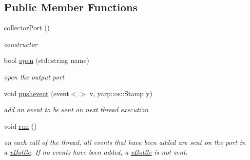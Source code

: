 \subsection*{Public Member Functions}
\begin{DoxyCompactItemize}
\item 
\hyperlink{classev_1_1collectorPort_ac7cd1de9c40bd46df66b67ae824bb258}{collector\+Port} ()\hypertarget{classev_1_1collectorPort_ac7cd1de9c40bd46df66b67ae824bb258}{}\label{classev_1_1collectorPort_ac7cd1de9c40bd46df66b67ae824bb258}

\begin{DoxyCompactList}\small\item\em constructor \end{DoxyCompactList}\item 
bool \hyperlink{classev_1_1collectorPort_a164072ae38c4e115873c451984b8e7f4}{open} (std\+::string name)\hypertarget{classev_1_1collectorPort_a164072ae38c4e115873c451984b8e7f4}{}\label{classev_1_1collectorPort_a164072ae38c4e115873c451984b8e7f4}

\begin{DoxyCompactList}\small\item\em open the output port \end{DoxyCompactList}\item 
void \hyperlink{classev_1_1collectorPort_ab1d587f6b728b65b22df73bbe674607d}{pushevent} (event$<$$>$ v, yarp\+::os\+::\+Stamp y)\hypertarget{classev_1_1collectorPort_ab1d587f6b728b65b22df73bbe674607d}{}\label{classev_1_1collectorPort_ab1d587f6b728b65b22df73bbe674607d}

\begin{DoxyCompactList}\small\item\em add an event to be sent on next thread execution \end{DoxyCompactList}\item 
void \hyperlink{classev_1_1collectorPort_a7ec227ae78ec71ca8867a20ae815ea7d}{run} ()\hypertarget{classev_1_1collectorPort_a7ec227ae78ec71ca8867a20ae815ea7d}{}\label{classev_1_1collectorPort_a7ec227ae78ec71ca8867a20ae815ea7d}

\begin{DoxyCompactList}\small\item\em on each call of the thread, all events that have been added are sent on the port in a \hyperlink{classev_1_1vBottle}{v\+Bottle}. If no events have been added, a \hyperlink{classev_1_1vBottle}{v\+Bottle} is not sent. \end{DoxyCompactList}\end{DoxyCompactItemize}


